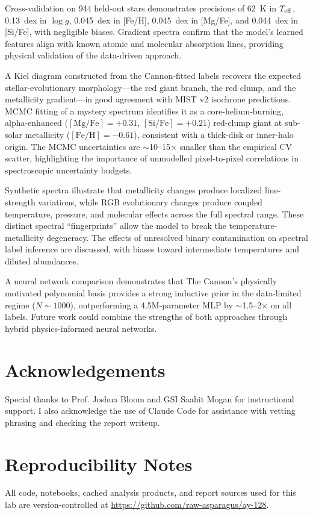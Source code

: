 \documentclass[10pt,preprint2]{aastex}
\begin{document}
Cross-validation on 944 held-out stars demonstrates precisions of 62~K in $T_{\rm eff}$, 0.13~dex in $\log g$, 0.045~dex in [Fe/H], 0.045~dex in [Mg/Fe], and 0.044~dex in [Si/Fe], with negligible biases. Gradient spectra confirm that the model's learned features align with known atomic and molecular absorption lines, providing physical validation of the data-driven approach.

A Kiel diagram constructed from the Cannon-fitted labels recovers the expected stellar-evolutionary morphology---the red giant branch, the red clump, and the metallicity gradient---in good agreement with MIST v2 isochrone predictions. MCMC fitting of a mystery spectrum identifies it as a core-helium-burning, alpha-enhanced ($[\mathrm{Mg/Fe}] = +0.31$, $[\mathrm{Si/Fe}] = +0.21$) red-clump giant at sub-solar metallicity ($[\mathrm{Fe/H}] = -0.61$), consistent with a thick-disk or inner-halo origin. The MCMC uncertainties are $\sim$10--15$\times$ smaller than the empirical CV scatter, highlighting the importance of unmodelled pixel-to-pixel correlations in spectroscopic uncertainty budgets.

Synthetic spectra illustrate that metallicity changes produce localized line-strength variations, while RGB evolutionary changes produce coupled temperature, pressure, and molecular effects across the full spectral range. These distinct spectral ``fingerprints'' allow the model to break the temperature-metallicity degeneracy. The effects of unresolved binary contamination on spectral label inference are discussed, with biases toward intermediate temperatures and diluted abundances.

A neural network comparison demonstrates that The Cannon's physically motivated polynomial basis provides a strong inductive prior in the data-limited regime ($N \sim 1000$), outperforming a 4.5M-parameter MLP by $\sim$1.5--2$\times$ on all labels. Future work could combine the strengths of both approaches through hybrid physics-informed neural networks.

\section*{Acknowledgements}
Special thanks to Prof. Joshua Bloom and GSI Saahit Mogan for instructional support.
I also acknowledge the use of Claude Code for assistance
with vetting phrasing and checking the report writeup.




\appendix

\section{Reproducibility Notes}

All code, notebooks, cached analysis products, and report sources used for this lab are version-controlled at \url{https://github.com/raw-asparagus/ay-128}.
\end{document}
